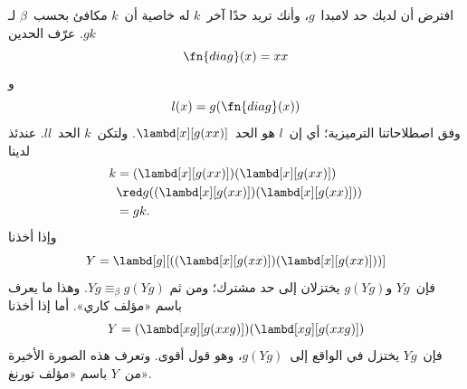 \documentclass[../../../include/open-logic-section]{subfiles}
\begin{document}

افترض أن لديك حد لامبدا~$g$، وأنك تريد حدًا آخر~$k$ له خاصية أن~$k$
مكافئ بحسب~$\beta$ لـ$gk$. عرّف الحدين
\[
\fn{diag}(x) = xx
\]
و
\[
l(x) = g(\fn{diag}(x))
\]
وفق اصطلاحاتنا الترميزية؛ أي إن~$l$ هو الحد~$\lambd[x][g(xx)]$.
ولتكن~$k$ الحد~$ll$. عندئذ لدينا
\begin{align*}
k & = (\lambd[x][g(xx)])(\lambd[x][g(xx)]) \\
& \red  g((\lambd[x][g(xx)])(\lambd[x][g(xx)])) \\
& = gk.
\end{align*}
وإذا أخذنا
\[
Y = \lambd[g][((\lambd[x][g(xx)])(\lambd[x][g(xx)]))]
\]
فإن~$Yg$ و$g(Yg)$ يختزلان إلى حد مشترك؛ ومن ثم
$Yg \equiv_\beta g(Yg)$. وهذا ما يعرف باسم «مؤلف كاري». أما إذا أخذنا
\[
Y = (\lambd[xg][g(xxg)])(\lambd[xg][g(xxg)])
\]
فإن~$Yg$ يختزل في الواقع إلى~$g(Yg)$، وهو قول أقوى. وتعرف هذه الصورة
الأخيرة من~$Y$ باسم «مؤلف تورنغ».
\end{document}
